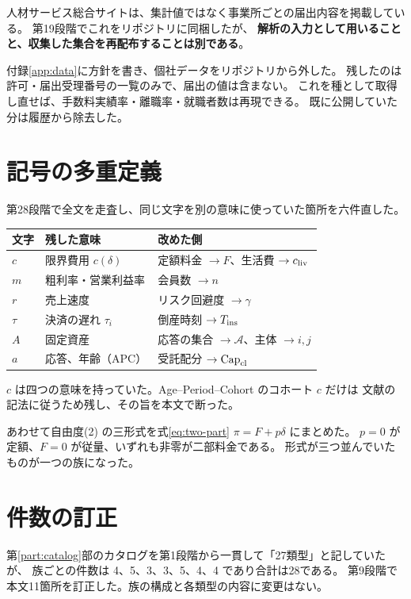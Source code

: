 人材サービス総合サイトは、集計値ではなく事業所ごとの届出内容を掲載している。
第19段階でこれをリポジトリに同梱したが、
\textbf{解析の入力として用いることと、収集した集合を再配布することは別である}。

付録\ref{app:data}に方針を書き、個社データをリポジトリから外した。
残したのは許可・届出受理番号の一覧のみで、届出の値は含まない。
これを種として取得し直せば、手数料実績率・離職率・就職者数は再現できる。
既に公開していた分は履歴から除去した。

\section{記号の多重定義}
\label{sec:rev-symbols}

第28段階で全文を走査し、同じ文字を別の意味に使っていた箇所を六件直した。

\begin{center}
\begin{tabularx}{\textwidth}{@{}llX@{}}
\toprule
文字 & 残した意味 & 改めた側 \\
\midrule
$c$ & 限界費用 $c(\delta)$ & 定額料金 $\to F$、生活費 $\to c_{\rm liv}$ \\
$m$ & 粗利率・営業利益率 & 会員数 $\to n$ \\
$r$ & 売上速度 & リスク回避度 $\to \gamma$ \\
$\tau$ & 決済の遅れ $\tau_i$ & 倒産時刻 $\to T_{\mathrm{ins}}$ \\
$A$ & 固定資産 & 応答の集合 $\to \mathcal{A}$、主体 $\to i,j$ \\
$a$ & 応答、年齢（APC） & 受託配分 $\to \mathrm{Cap}_{\mathrm{cl}}$ \\
\bottomrule
\end{tabularx}
\label{tab:symbol-collisions}
\end{center}

$c$ は四つの意味を持っていた。Age--Period--Cohort のコホート $c$ だけは
文献の記法に従うため残し、その旨を本文で断った。

あわせて自由度(2) の三形式を式\eqref{eq:two-part} $\pi=F+p\delta$ にまとめた。
$p=0$ が定額、$F=0$ が従量、いずれも非零が二部料金である。
形式が三つ並んでいたものが一つの族になった。

\section{件数の訂正}

第\ref{part:catalog}部のカタログを第1段階から一貫して「27類型」と記していたが、
族ごとの件数は 4、5、3、3、5、4、4 であり合計は28である。
第9段階で本文11箇所を訂正した。族の構成と各類型の内容に変更はない。

